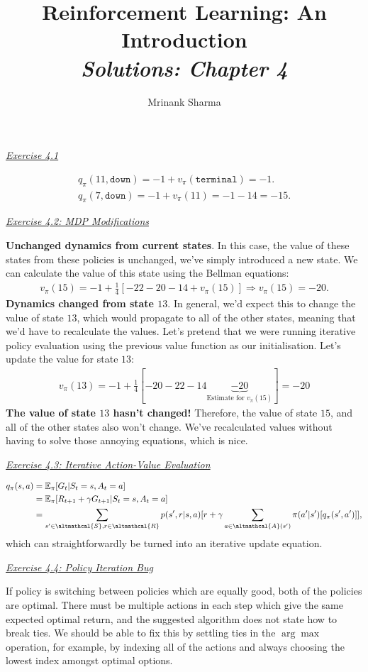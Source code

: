 \documentclass{article}
\title{\textbf{Reinforcement Learning: An Introduction}\\
\textit{Solutions: Chapter 4}
}
\author{Mrinank Sharma}
\newcommand{\myq}[1]{%
	\vspace{1em}
	\noindent\underline{\emph{Exercise #1}}\vspace{0.25em}\linebreak
}
\begin{document}
\maketitle

\myq{4.1}
\begin{align}
q_\pi(11, \texttt{down}) = -1 + v_\pi(\texttt{terminal}) = -1. \\
q_\pi(7, \texttt{down}) = -1 + v_\pi(11) = -1 -14 = -15 .
\end{align}  

\myq{4.2: MDP Modifications}
\textbf{Unchanged dynamics from current states}. In this case, the value of these states from these policies is unchanged, we've simply introduced a new state. We can calculate the value of this state using the Bellman equations:
\begin{align}
v_\pi(15) = -1 + \frac{1}{4}[-22 -20 -14 +v_\pi(15)] \Rightarrow v_\pi(15) = -20.
\end{align}
\textbf{Dynamics changed from state $13$}. In general, we'd expect this to change the value of state $13$, which would propagate to all of the other states, meaning that we'd have to recalculate the values. Let's pretend that we were running iterative policy evaluation using the previous value function as our initialisation. Let's update the value for state $13$:
\begin{align}
v_\pi(13) = -1 + \frac{1}{4}[-20 -22 -14 \underbrace{-20}_{\text{Estimate for } v_\pi(15)}] = -20
\end{align}
\textbf{The value of state $13$ hasn't changed!} Therefore, the value of state $15$, and all of the other states also won't change. We've recalculated values without having to solve those annoying equations, which is nice. 

\myq{4.3: Iterative Action-Value Evaluation}
\begin{align}
q_\pi(s, a) &=\mathbb{E}_\pi[G_t | S_t = s, A_t = a] \nonumber \\
&= \mathbb{E}_\pi[R_{t+1} + \gamma G_{t+1} | S_t = s, A_t = a] \nonumber \\
&= \sum_{s' \in \altmathcal{S}, r \in \altmathcal{R}} p(s', r | s, a) [r + \gamma \sum_{a \in \altmathcal{A}(s')} \pi(a' | s')[q_\pi(s', a')]],
\end{align}
which can straightforwardly be turned into an iterative update equation. 

\myq{4.4: Policy Iteration Bug}
If policy is switching between policies which are equally good, both of the policies are optimal. There must be multiple actions in each step which give the same expected optimal return, and the suggested algorithm does not state how to break ties. We should be able to fix this by settling ties in the $\arg\max$ operation, for example, by indexing all of the actions and always choosing the lowest index amongst optimal options. 
\end{document}
